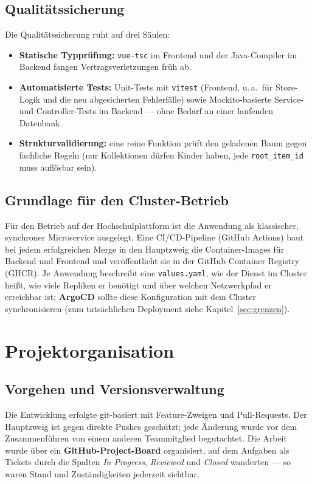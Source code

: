 \documentclass[11pt,a4paper]{article}
\begin{document}
\subsection{Qualitätssicherung}
Die Qualitätssicherung ruht auf drei Säulen:
\begin{itemize}
  \item \textbf{Statische Typprüfung:} \texttt{vue-tsc} im Frontend und der
  Java-Compiler im Backend fangen Vertragsverletzungen früh ab.
  \item \textbf{Automatisierte Tests:} Unit-Tests mit \texttt{vitest} (Frontend,
  u.\,a.\ für Store-Logik und die neu abgesicherten Fehlerfälle) sowie
  Mockito-basierte Service- und Controller-Tests im Backend --- ohne Bedarf an
  einer laufenden Datenbank.
  \item \textbf{Strukturvalidierung:} eine reine Funktion prüft den geladenen
  Baum gegen fachliche Regeln (nur Kollektionen dürfen Kinder haben, jede
  \texttt{root\_item\_id} muss auflösbar sein).
\end{itemize}

\subsection{Grundlage für den Cluster-Betrieb}
Für den Betrieb auf der Hochschulplattform ist die Anwendung als klassischer,
synchroner Microservice ausgelegt. Eine CI/CD-Pipeline (GitHub Actions) baut bei
jedem erfolgreichen Merge in den Hauptzweig die Container-Images für Backend und
Frontend und veröffentlicht sie in der GitHub Container Registry (GHCR). Je
Anwendung beschreibt eine \texttt{values.yaml}, wie der Dienst im Cluster heißt,
wie viele Repliken er benötigt und über welchen Netzwerkpfad er erreichbar ist;
\textbf{ArgoCD} sollte diese Konfiguration mit dem Cluster synchronisieren (zum
tatsächlichen Deployment siehe Kapitel~\ref{sec:grenzen}).

\section{Projektorganisation}\label{sec:orga}

\subsection{Vorgehen und Versionsverwaltung}
Die Entwicklung erfolgte git-basiert mit Feature-Zweigen und Pull-Requests. Der
Hauptzweig ist gegen direkte Pushes geschützt; jede Änderung wurde vor dem
Zusammenführen von einem anderen Teammitglied begutachtet. Die Arbeit wurde über
ein \textbf{GitHub-Project-Board} organisiert, auf dem Aufgaben als Tickets durch
die Spalten \emph{In Progress}, \emph{Reviewed} und \emph{Closed} wanderten ---
so waren Stand und Zuständigkeiten jederzeit sichtbar.
\end{document}
